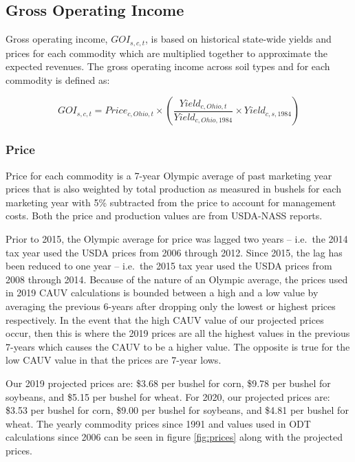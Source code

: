 \documentclass[]{article}
\begin{document}
\newpage

\hypertarget{gross-operating-income}{%
\subsection{Gross Operating Income}\label{gross-operating-income}}

Gross operating income, \(GOI_{s,c,t}\), is based on historical
state-wide yields and prices for each commodity which are multiplied
together to approximate the expected revenues. The gross operating
income across soil types and for each commodity is defined as:

\[
GOI_{s,c,t} = Price_{c,Ohio,t} \times \left( \frac{Yield_{c,Ohio,t}}{Yield_{c,Ohio,1984}} \times Yield_{c,s,1984} \right)
\]

\hypertarget{price}{%
\subsubsection{Price}\label{price}}

Price for each commodity is a 7-year Olympic average of past marketing
year prices that is also weighted by total production as measured in
bushels for each marketing year with 5\% subtracted from the price to
account for management costs. Both the price and production values are
from USDA-NASS reports.

Prior to 2015, the Olympic average for price was lagged two years --
i.e.~the 2014 tax year used the USDA prices from 2006 through 2012.
Since 2015, the lag has been reduced to one year -- i.e.~the 2015 tax
year used the USDA prices from 2008 through 2014. Because of the nature
of an Olympic average, the prices used in 2019 CAUV calculations is
bounded between a high and a low value by averaging the previous 6-years
after dropping only the lowest or highest prices respectively. In the
event that the high CAUV value of our projected prices occur, then this
is where the 2019 prices are all the highest values in the previous
7-years which causes the CAUV to be a higher value. The opposite is true
for the low CAUV value in that the prices are 7-year lows.

Our 2019 projected prices are: \$3.68 per bushel for corn, \$9.78 per
bushel for soybeans, and \$5.15 per bushel for wheat. For 2020, our
projected prices are: \$3.53 per bushel for corn, \$9.00 per bushel for
soybeans, and \$4.81 per bushel for wheat. The yearly commodity prices
since 1991 and values used in ODT calculations since 2006 can be seen in
figure \ref{fig:prices} along with the projected prices.
\end{document}
